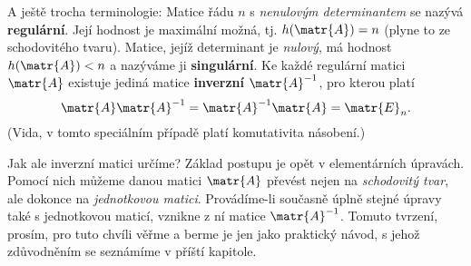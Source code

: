       A ještě trocha terminologie: Matice řádu \(n\) s \emph{nenulovým determinantem} se nazývá
      \textbf{regulární}. Její hodnost je maximální možná, tj. \(h(\matr{A}) = n\) (plyne to ze
      schodovitého tvaru). Matice, jejíž determinant je \emph{nulový}, má hodnost \(h(\matr{A}) <
      n\) a nazýváme ji \textbf{singulární}. Ke každé regulární matici \(\matr{A}\) existuje jediná
      matice \textbf{inverzní} \(\matr{A}^{-1}\), pro kterou platí
      \begin{equation*}
        \matr{A}\matr{A}^{-1} = \matr{A}^{-1}\matr{A} = \matr{E}_n.
      \end{equation*}
      (Vida, v tomto speciálním případě platí komutativita násobení.)

      Jak ale inverzní matici určíme? Základ postupu je opět v elementárních úpravách. Pomocí nich
      můžeme danou matici \(\matr{A}\) převést nejen na \emph{schodovitý tvar}, ale dokonce na
      \emph{jednotkovou matici}. Provádíme-li současně úplně stejné úpravy také s jednotkovou
      maticí, vznikne z ní matice \(\matr{A}^{-1}\). Tomuto tvrzení, prosím, pro tuto chvíli věřme a
      berme je jen jako praktický návod, s jehož zdůvodněním se seznámíme v příští kapitole.

